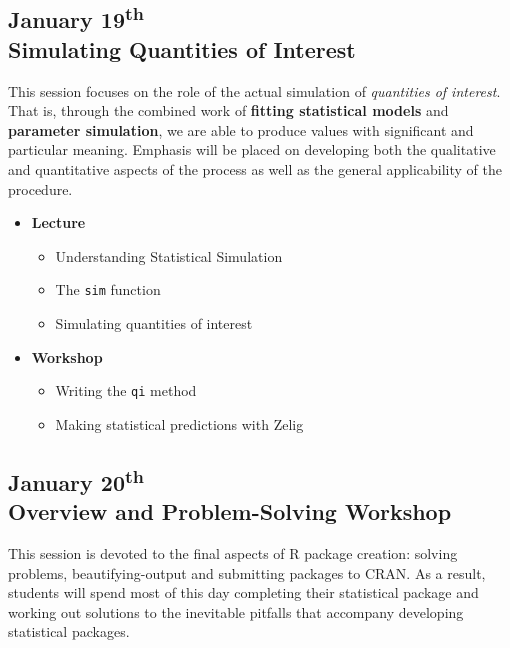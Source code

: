 \documentclass{article}
\begin{document}
\subsection{January 19\textsuperscript{th} \\ Simulating Quantities of Interest}

This session focuses on the role of the actual simulation of \emph{quantities of interest}.
That is, through the combined work of {\bf fitting statistical models} and {\bf parameter
simulation}, we are able to produce values with significant and particular meaning.
Emphasis will be placed on developing both the qualitative and quantitative aspects of the
process as well as the general applicability of the procedure.

\begin{itemize}

  \item {\bf Lecture}
    \begin{itemize}
      \item Understanding Statistical Simulation
      \item The {\tt sim} function
      \item Simulating quantities of interest
    \end{itemize}
	
  \item {\bf Workshop}
    \begin{itemize}
      \item Writing the {\tt qi} method
      \item Making statistical predictions with Zelig
    \end{itemize}

\end{itemize}



\subsection{January 20\textsuperscript{th} \\ Overview and Problem-Solving Workshop}

This session is devoted to the final aspects of R package creation: solving problems, 
beautifying-output and submitting packages to CRAN. As a result, students will spend most of this
day completing their statistical package and working out solutions to the inevitable pitfalls
that accompany developing statistical packages.
\end{document}
